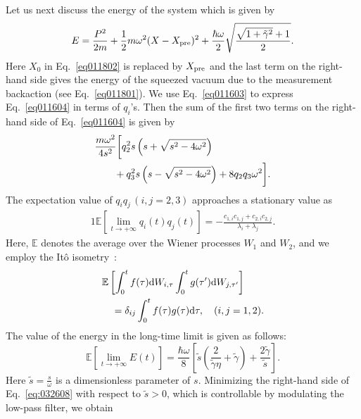 \documentclass[aps,pra,superscriptaddress,twocolumn
]{revtex4-2}
\renewcommand{\d}{{\rm d}}
\begin{document}
 
 
 
 Let us next discuss the energy of the system  which is given by
 \begin{equation}
  E = \frac{P^2}{2m}+\frac{1}{2}m\omega^2 (X-X_{\rm pre})^2 + 
  \frac{\hbar\omega}{2} \sqrt{\frac{\sqrt{1+\tilde \gamma^2}+1}{2}}. \label{eq011604}
 \end{equation}
 Here $X_0$ in Eq.~\eqref{eq011802} is replaced by $X_{\rm pre}$ and 
 the last term on the right-hand side gives the energy of the squeezed vacuum due to the measurement backaction 
 (see Eq.~\eqref{eq011801}). 
 We use Eq.~\eqref{eq011603} to express Eq.~\eqref{eq011604} in terms of $q_i$'s.
 Then the sum of the first two terms on the right-hand side of Eq.~\eqref{eq011604} is given by 
 \begin{alignat}{1}
  &\frac{m \omega ^2}{4 s^2} \bigg[q_2^2 s \left(s+\sqrt{s^2-4 \omega ^2}\right) \notag \\
  &\qquad + q_3^2 s \left(s-\sqrt{s^2-4 \omega ^2}\right)
  +8 q_2 q_3 \omega ^2\bigg].
 \end{alignat}
 The expectation value of $q_i q_j \,(i,j=2,3)$ approaches a stationary value as
 \begin{alignat}{1}
  \mathbb{E}\left[\lim_{t\to + \infty} q_i(t) q_j(t)\right]
  = - \frac{c_{1,i}c_{1,j}+ c_{2,i}c_{2,j} }{\lambda_i + \lambda_j}.
 \end{alignat}
 Here, $\mathbb{E}$ denotes the average over the Wiener processes $W_1$ and $W_2$, 
 and we employ the It\^o isometry~\cite{oksendal2013stochastic}:
 \begin{alignat}{1}
  &\mathbb{E} \left[\int_0^t f(\tau) \d W_{i,\tau} \int_0^t g(\tau')\d W_{j,\tau'}\right] \notag \\
  &\quad = \delta_{ij} \int_0^t f(\tau) g(\tau) \d \tau,\quad (i,j=1,2). 
  \label{eq012004}
 \end{alignat}
 The value of the energy in the long-time limit %
 is given as follows:
 \begin{equation}
  \mathbb{E} \left[\lim_{t\to +\infty} E(t)\right] =
  \frac{\hbar \omega}{8} 
  \left[\tilde s \left(\frac{2}{\tilde \gamma \eta}+\tilde \gamma\right)
  +\frac{2 \tilde \gamma}{\tilde s}\right]. \label{eq:032608}
 \end{equation}
 Here $\tilde s = \frac{s}{\omega}$ is a dimensionless parameter of $s$.
 Minimizing the right-hand side of Eq.~\eqref{eq:032608} with respect to $\tilde s > 0$, 
 which is controllable by modulating the low-pass filter, 
 we obtain 
\end{document}
